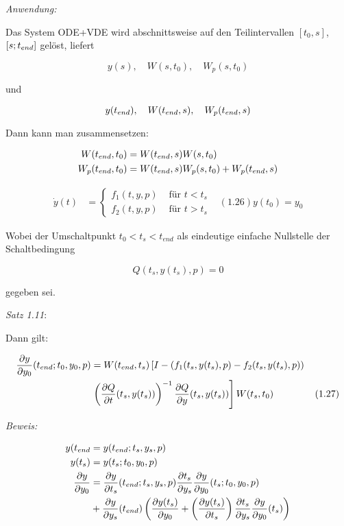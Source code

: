 \emph{Anwendung:}

Das System ODE+VDE wird abschnittsweise auf den Teilintervallen $[t_0,s]$, $[s;{t_{end}}]$ gelöst, liefert

\[y(s),\quad W(s,t_0), \quad W_p(s,t_0) \]

und

\[ y({t_{end}}), \quad W({t_{end}},s), \quad W_p({t_{end}},s)\]

Dann kann man zusammensetzen:

\begin{align*}
W({t_{end}},t_0) &= W({t_{end}}, s) W(s,t_0) \\
W_p({t_{end}},t_0) &= W({t_{end}}, s) W_p(s,t_0) + W_p({t_{end}}, s) 
\end{align*}


\begin{align*}
\dot y(t) &= \begin{cases} f_1(t,y,p) & \text{ für } t < t_s \\ f_2(t,y,p) & \text{ für } t > t_s \end{cases} & (1.26)
y(t_0) = y_0
\end{align*}

Wobei der Umschaltpunkt $t_0 < t_s < t_{end}$ als eindeutige einfache Nullstelle der Schaltbedingung

\[ Q(t_s,y(t_s),p) = 0 \]

gegeben sei.

\emph{Satz 1.11}:

Dann gilt:

\begin{align*}
\frac{\partial y}{\partial y_0} (t_{end}; t_0,y_0,p) &= W(t_{end},t_s) \left[I-(f_1(t_s,y(t_s),p)-f_2(t_s,y(t_s),p)) \right. \\ 
& \left.\left( \frac{\partial Q}{\partial t} (t_s,y(t_s))\right)^{-1} \frac{\partial Q}{\partial y}(t_s,y(t_s)) \right] W(t_s,t_0) & (1.27) \\
\end{align*}

\emph{Beweis:}

\begin{align*}
y(t_{end} &= y(t_{end}; t_s,y_s,p) \\
y(t_s) &= y(t_s; t_0,y_0,p) \\
\frac{\partial y}{\partial y_0} &= \frac{\partial y}{\partial t_s} (t_{end}; t_s,y_s,p) \frac{\partial t_s}{\partial y_s} \frac{\partial y}{\partial y_0} (t_s; t_0,y_0,p) \\
&+ \frac{\partial y}{\partial y_s}(t_{end}) \left( \frac{\partial y(t_s)}{\partial y_0} + \left( \frac{\partial y(t_s)}{\partial t_s} \right) \frac{\partial t_s}{\partial y_s} \frac{\partial y}{\partial y_0}(t_s) \right) \\
\end{align*}

